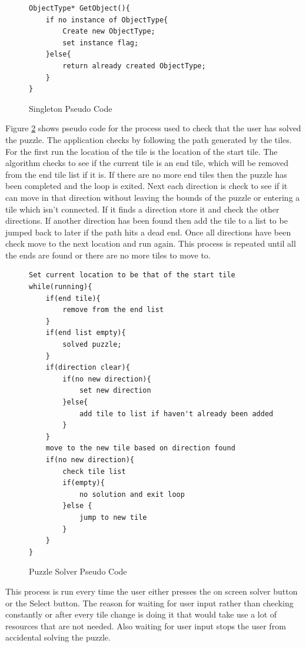 \begin{figure}[h|]
\centering
\begin{lstlisting}
ObjectType* GetObject(){
	if no instance of ObjectType{
		Create new ObjectType;
		set instance flag;
	}else{
		return already created ObjectType;
	}
}
\end{lstlisting}
\caption{Singleton Pseudo Code}
\label{sc:singleton_pattern}
\end{figure}

Figure \ref{sc:puzzle solver} shows pseudo code for the process used to check that the user has solved the puzzle.
The application checks by following the path generated by the tiles. For the first run the location of the tile is the location of the start tile.
The algorithm checks to see if the current tile is an end tile, which will be removed from the end tile list if it is.
If there are no more end tiles then the puzzle has been completed and the loop is exited.
Next each direction is check to see if it can move in that direction without leaving the bounds of the puzzle or entering a tile which isn't connected.
If it finds a direction store it and check the other directions.
If another direction has been found then add the tile to a list to be jumped back to later if the path hits a dead end. Once all directions have been check move to the next location and run again.
This process is repeated until all the ends are found or there are no more tiles to move to.

\begin{figure}[h!]
\centering
\begin{lstlisting}
Set current location to be that of the start tile
while(running){
	if(end tile){
		remove from the end list
	}
	if(end list empty){
		solved puzzle;
	}
	if(direction clear){
		if(no new direction){
			set new direction
		}else{
			add tile to list if haven't already been added
		}
	}
	move to the new tile based on direction found
	if(no new direction){
		check tile list
		if(empty){
			no solution and exit loop
		}else {
			jump to new tile
		}
	}
}
\end{lstlisting}
\caption{Puzzle Solver Pseudo Code}
\label{sc:puzzle solver}
\end{figure}

This process is run every time the user either presses the on screen solver button or the Select button.
The reason for waiting for user input rather than checking constantly or after every tile change is doing it that would take use a lot of resources that are not needed.
Also waiting for user input stops the user from accidental solving the puzzle.